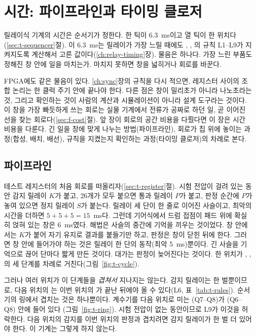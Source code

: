 \chapter{시간: 파이프라인과 타이밍 클로저}\label{ch:pipeline}

릴레이식 기계의 시간은 순서기가 정한다. 한 틱이 6.3~ms이고 열 틱이 한 위치다(\ref{sec:t-sequencer}절).
이 6.3~ms는 릴레이가 가장 느릴 때에도 , ,
의 규칙 L1--L9가 지켜지도록 계산해서 고른 값이다(\ref{ch:relay-timing}장). 물음은 하나다. 가장
느린 부품도 정해진 창 안에 일을 마치는가. 마치지 못하면 창을 넓히거나 회로를 바꾼다.

FPGA에도 같은 물음이 있다. \ref{ch:sync}장의 규칙을 다시 적으면, 레지스터 사이의 조합 논리는 한 클럭 주기
안에 끝나야 한다. 다른 점은 창이 밀리초가 아니라 나노초라는 것, 그리고 확인하는 것이 사람의 계산과
시뮬레이션이 아니라 설계 도구라는 것이다. 이 창을 가장 빠듯하게 쓰는 회로는 실물 기계에서 전류가 공짜로
하던 일, 곧 이어진 선을 찾는 회로다(\ref{sec:f-cost}절). 앞 장이 회로의 공간 비용을 다뤘다면 이 장은 시간
비용을 다룬다. 긴 일을 창에 맞게 나누는 방법(파이프라인), 회로가 칩 위에 놓이는 과정(합성, 배치, 배선),
규칙을 지켰는지 확인하는 과정(타이밍 클로저)의 차례로 본다.

\section{파이프라인}\label{sec:pipeline}

\Relay 테스트 레지스터의 처음 회로를 떠올리자(\ref{sec:t-register}절). 시험 전압이 걸려 있는 동안 감지
릴레이 $K$가 붙고, 26개가 모두 붙으면 통과 릴레이 $P$가 붙고, 판정 순간에 $P$가 놓여 있으면 정지 릴레이
$S$가 붙는다. 릴레이 세 단이 한 줄로 이어진 사슬이고, 최악의 시간을 더하면 $5 + 5 + 5 = 15$~ms다. 그런데
기어식에서 드럼 접점이 패드 위에 확실히 얹혀 있는 창은 6~ms였다. 해법은 사슬의 중간에 기억을 끼우는
것이었다. 창 안에서는 $K$가 붙어 자기 유지로 결과를 붙들기만 하고, 판정은 창이 닫힌 뒤에 한다. 그러면 창
안에 들어가야 하는 것은 릴레이 한 단의 동작(최악 5~ms)뿐이다. 긴 사슬을 기억으로 끊어 단마다 짧게 만든
것이다. 대가는 판정이 늦어진다는 것이다. 한 위치가 , , 의 세 단계를
차례로 거친다(그림~\ref{fig:t-cycle}).

그러나 여러 위치가 이 단계들을 \emph{겹쳐서} 지나지는 않는다. 감지 릴레이는 한 벌뿐이므로, 다음 위치의
는 이번 위치의 가 끝난 뒤에야 올 수 있다(L6, 표~\ref{tab:t-rules}). 순서기의 링에서
겹치는 것은 하나뿐이다. 계수기를 다음 위치로 미는 (Q7--Q8)가 (Q6--Q8) 안에 들어 있다
(그림~\ref{fig:t-ring}). 시험 전압이 없는 동안이므로 L9가 이것을 허락한다. 다음 위치의 감지를 이번 위치의
판정과 겹치려면 감지 릴레이가 한 벌 더 있어야 한다. 이 기계는 그렇게 하지 않는다.

